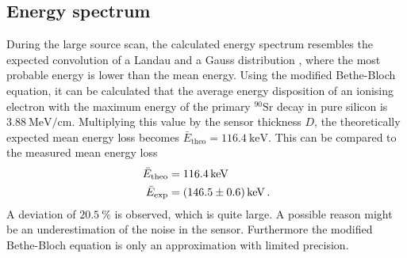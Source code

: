 \subsection{Energy spectrum}

During the large source scan, the calculated energy spectrum resembles the expected convolution of a
Landau and a Gauss distribution \cite{V15}, where the most probable energy is lower than the mean energy.
Using the modified Bethe-Bloch equation, it can be calculated that the average energy disposition 
of an ionising electron with the maximum energy of the primary $^{90}\text{Sr}$ decay in pure silicon is
$\qty{3.88}{\mega\electronvolt\per\centi\meter}$.
Multiplying this value by the sensor thickness $D$, the theoretically expected mean energy loss becomes
$\bar{E}_{\text{theo}} = \qty{116.4}{\kilo\electronvolt}$. This can be compared to the measured
mean energy loss
\begin{align*}
    \bar{E}_{\text{theo}} &= \qty{116.4}{\kilo\electronvolt} \\
    \bar{E}_{\text{exp}} &= \qty{146.5+-0.6}{\kilo\electronvolt}\, .
\end{align*}
A deviation of $\qty{20.5}{\percent}$ is observed, which is quite large. A possible reason might be an underestimation
of the noise in the sensor. Furthermore the modified Bethe-Bloch equation is only an approximation with limited
precision.